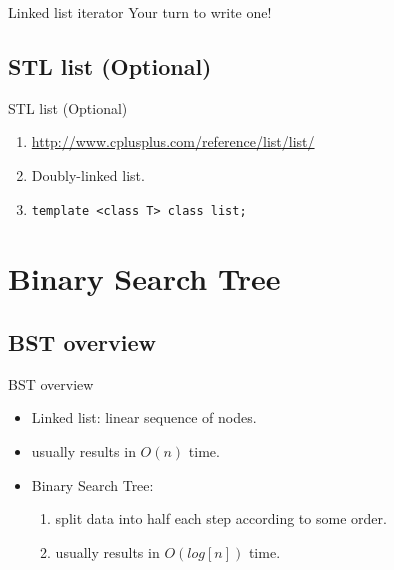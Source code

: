 \documentclass{beamer}
\begin{document}
\begin{frame}{Linked list iterator}
Your turn to write one!

\end{frame}

\subsection{STL list (Optional)}
\begin{frame}[fragile]{STL list (Optional)}
        \begin{enumerate}
            \item \url{http://www.cplusplus.com/reference/list/list/}
            \item Doubly-linked list.
            \item \begin{verbatim}template <class T> class list;\end{verbatim}
        \end{enumerate}
\end{frame}

\section{Binary Search Tree}
\subsection{BST overview}
\begin{frame}{BST overview}
    \begin{itemize}
        \item Linked list: linear sequence of nodes.
        \item   usually results in $O(n)$ time.
        \item Binary Search Tree:
            \begin{enumerate}
                \item split data into half each step according to some order.
                \item usually results in $O(log[n])$ time.
            \end{enumerate}
    \end{itemize}
\end{frame}
\end{document}

